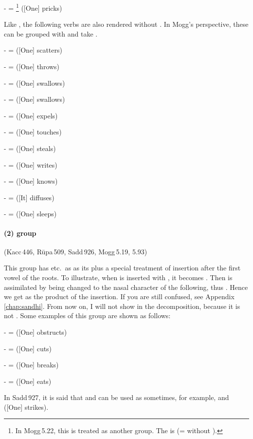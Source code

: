 -  = \footnote{In Mogg\,5.22, this is treated as another group. The  is  (=  without ).} ([One] pricks)\par
Like , the following verbs are also rendered without . In Mogg's perspective, these can be grouped with  and take .\par
-  =  ([One] scatters)\par
-  =  ([One] throws)\par
-  =  ([One] swallows)\par
-  =  ([One] swallows)\par
-  =  ([One] expels)\par
-  =  ([One] touches)\par
-  =  ([One] steals)\par
-  =  ([One] writes)\par
-  =  ([One] knows)\par
-  =  ([It] diffuses)\par
-  =  ([One] sleeps)\par

\paragraph*{(2)  group} (Kacc\,446, R\=upa\,509, Sadd\,926, Mogg\,5.19, 5.93)\label{pacca:a2}\label{pacca:i}\label{pacca:ii}\label{pacca:e}\label{pacca:o1}\label{pacca:la2}\par
This group has  etc.\ as as its  plus a special treatment of  insertion after the first vowel of the roots. To illustrate, when  is inserted with , it becomes . Then  is assimilated by being changed to the nasal character of the following, thus . Hence we get  as the product of the insertion. If you are still confused, see Appendix \ref{chap:sandhi}. From now on, I will not show  in the decomposition, because it is not . Some examples of this group are shown as follows:\par
-  =  ([One] obstructs)\par
-  =  ([One] cuts)\par
-  =  ([One] breaks)\par
-  =  ([One] eats)\par
In Sadd\,927, it is said that  and  can be used as  sometimes, for example,  and  ([One] strikes).

